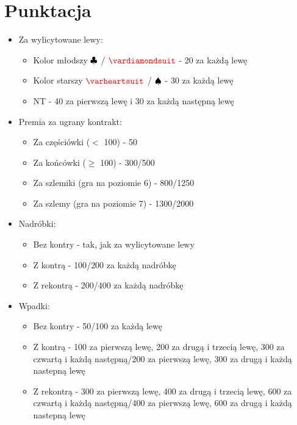 \documentclass{article}
\newcommand*\Hs[1]{\ensuremath{\color{red}\varheartsuit}}
\newcommand*\Ss[1]{\ensuremath{\color{black}\spadesuit}}
\newcommand*\Ds[1]{\ensuremath{\color{red}\vardiamondsuit}}
\newcommand*\Cs[1]{\ensuremath{\color{black}\clubsuit}}
\newcommand*\NT[1]{{\color{black}\textsc{NT}}}
\begin{document}
    \section{Punktacja}
    	\begin{itemize}
    	\item Za wylicytowane lewy:
    		\begin{itemize}
    		\item Kolor młodszy \Cs{} / \Ds{} - 20 za każdą lewę
    		\item Kolor starszy \Hs{} / \Ss{} - 30 za każdą lewę
    		\item \NT{} - 40 za pierwszą lewę i 30 za każdą następną lewę
    		\end{itemize}
    	\item Premia za ugrany kontrakt:
    		\begin{itemize}
    		\item Za częściówki ($<$ 100) - 50
    		\item Za końcówki ($\geq$ 100) - {\color{green}300}/{\color{red}500}
    		\item Za szlemiki (gra na poziomie 6) - {\color{green}800}/{\color{red}1250}
    		\item Za szlemy (gra na poziomie 7) - {\color{green}1300}/{\color{red}2000}
    		\end{itemize}    	
    	\item Nadróbki:
    		\begin{itemize}
    		\item Bez kontry - tak, jak za wylicytowane lewy
    		\item Z kontrą - {\color{green}100}/{\color{red}200} za każdą nadróbkę
    		\item Z rekontrą - {\color{green}200}/{\color{red}400} za każdą nadróbkę
    		\end{itemize}  	
    	\item Wpadki:
    		\begin{itemize}
    		\item Bez kontry - {\color{green}50}/{\color{red}100} za każdą lewę
    		\item Z kontrą - {\color{green}100} za pierwszą lewę, {\color{green}200} za drugą i trzecią lewę, {\color{green}300} za czwartą i każdą następną/{\color{red}200} za pierwszą lewę, {\color{red}300} za drugą i każdą nastepną lewę
    		\item Z rekontrą - {\color{green}300} za pierwszą lewę, {\color{green}400} za drugą i trzecią lewę, {\color{green}600} za czwartą i każdą następną/{\color{red}400} za pierwszą lewę, {\color{red}600} za drugą i każdą nastepną lewę
    		\end{itemize}
    	\end{itemize}
\end{document}
